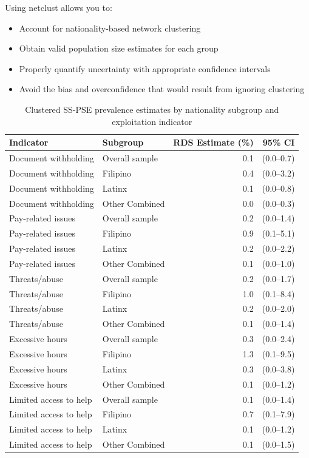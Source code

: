 \documentclass[
  12pt,
  letterpaper,
  DIV=11,
  numbers=noendperiod]{scrartcl}
\providecommand{\tightlist}{%
  \setlength{\itemsep}{0pt}\setlength{\parskip}{0pt}}
\theoremstyle{plain}
\theoremstyle{definition}
\begin{document}
Using netclust allows you to:

\begin{itemize}
\tightlist
\item
  Account for nationality-based network clustering
\item
  Obtain valid population size estimates for each group
\item
  Properly quantify uncertainty with appropriate confidence intervals
\item
  Avoid the bias and overconfidence that would result from ignoring
  clustering
\end{itemize}

\begin{longtable}[t]{llrr}
\caption{\label{tab:netclust-analysis}Clustered SS-PSE prevalence estimates by nationality subgroup and exploitation indicator}\\
\toprule
Indicator & Subgroup & RDS Estimate (\%) & 95\% CI\\
\midrule
Document
withholding & Overall sample & 0.1 & (0.0–0.7)\\
Document
withholding & Filipino & 0.4 & (0.0–3.2)\\
Document
withholding & Latinx & 0.1 & (0.0–0.8)\\
Document
withholding & Other
Combined & 0.0 & (0.0–0.3)\\
Pay-related issues & Overall sample & 0.2 & (0.0–1.4)\\
Pay-related issues & Filipino & 0.9 & (0.1–5.1)\\
Pay-related issues & Latinx & 0.2 & (0.0–2.2)\\
Pay-related issues & Other
Combined & 0.1 & (0.0–1.0)\\
Threats/abuse & Overall sample & 0.2 & (0.0–1.7)\\
Threats/abuse & Filipino & 1.0 & (0.1–8.4)\\
Threats/abuse & Latinx & 0.2 & (0.0–2.0)\\
Threats/abuse & Other
Combined & 0.1 & (0.0–1.4)\\
Excessive hours & Overall sample & 0.3 & (0.0–2.4)\\
Excessive hours & Filipino & 1.3 & (0.1–9.5)\\
Excessive hours & Latinx & 0.3 & (0.0–3.8)\\
Excessive hours & Other
Combined & 0.1 & (0.0–1.2)\\
Limited access to help & Overall sample & 0.1 & (0.0–1.4)\\
Limited access to help & Filipino & 0.7 & (0.1–7.9)\\
Limited access to help & Latinx & 0.1 & (0.0–1.2)\\
Limited access to help & Other
Combined & 0.1 & (0.0–1.5)\\
\bottomrule
\end{longtable}
\end{document}

